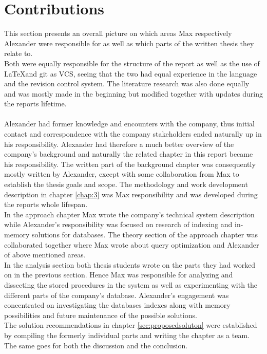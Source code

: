 \documentclass{cslthse-msc}
\begin{document}
\section{Contributions}
This section presents an overall picture on which areas Max respectively Alexander were responsible for as well as which parts of the written thesis they relate to.\\
Both were equally responsible for the structure of the report as well as the use of \LaTeX and git as VCS, seeing that the two had equal experience in the language and the revision control system. The literature research was also done equally and was mostly made in the beginning but modified together with updates during the reports lifetime.\\\\
Alexander had former knowledge and encounters with the company, thus initial contact and correspondence with the company stakeholders ended naturally up in his responsibility. Alexander had therefore a much better overview of the company's background and naturally the related chapter in this report became his responsibility. The written part of the background chapter was consequently mostly written by Alexander, except with some collaboration from Max to establish the thesis goals and scope. The methodology and work development description in chapter \ref{chap:3} was Max responsibility and was developed during the reports whole lifespan.\\
In the approach chapter Max wrote the company's technical system description while Alexander's responsibility was focused on research of indexing and in-memory solutions for databases. The theory section of the approach chapter was collaborated together where Max wrote about query optimization and Alexander of above mentioned areas.\\
In the analysis section both thesis students wrote on the parts they had worked on in the previous section. Hence Max was responsible for analyzing and dissecting the stored procedures in the system as well as experimenting with the different parts of the company's database. Alexander's engagement was concentrated on investigating the databases indexes along with memory possibilities and future maintenance of the possible solutions.\\           
The solution recommendations in chapter \ref{sec:proposedsoluton} were established by compiling the formerly individual parts and writing the chapter as a team. The same goes for both the discussion and the conclusion. 
      
\end{document}
